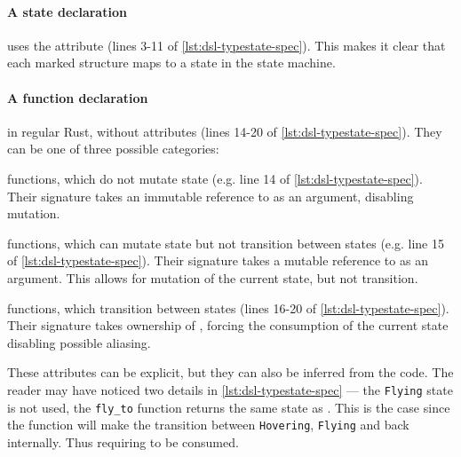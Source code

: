 \paragraph{A state declaration} uses the \keyword{\#[state]} attribute (lines 3-11 of \autoref{lst:dsl-typestate-spec}).
This makes it clear that each marked structure maps to a state in the state machine.

\paragraph{A function declaration} in regular Rust, without attributes (lines 14-20 of \autoref{lst:dsl-typestate-spec}).
They can be one of three possible categories:
\begin{compactitem}
    \item {} functions, which do not mutate state (e.g. line 14 of \autoref{lst:dsl-typestate-spec}).
    Their signature takes an immutable reference to  as an argument,
    disabling mutation.
    \item {} functions, which can mutate state but not transition between states (e.g. line 15 of \autoref{lst:dsl-typestate-spec}).
    Their signature takes a mutable reference to  as an argument.
    This allows for mutation of the current state, but not transition.
    \item {} functions, which transition between states (lines 16-20 of \autoref{lst:dsl-typestate-spec}).
    Their signature takes ownership of ,
    forcing the consumption of the current state disabling possible aliasing.
\end{compactitem}
These attributes can be explicit, but they can also be inferred from the code.
The reader may have noticed two details in \autoref{lst:dsl-typestate-spec} ---
the \texttt{Flying} state is not used,
the \texttt{fly\_to} function returns the same state as .
This is the case since the function will make the transition between \texttt{Hovering}, \texttt{Flying} and back internally.
Thus requiring  to be consumed.



